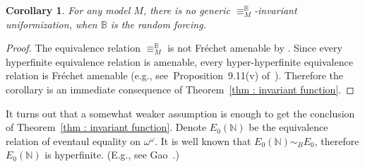\documentclass{amsart}
\newtheorem{corollary}[theorem]{Corollary}
\theoremstyle{definition}
\theoremstyle{remark}
\begin{document}
\begin{corollary}
\label{cor : Random}
    For any model \(M\), there is no generic \(\equiv^\mathbb{B}_M\)-invariant uniformization, when \(\mathbb{B}\) is the random forcing. 
\end{corollary}
\begin{proof}
The equivalence relation \(\equiv^\mathbb{B}_M\) is not Fr\'echet amenable by \cite[Theorem~4.4]{Smy22}.
Since every hyperfinite equivalence relation is amenable, every hyper-hyperfinite equivalence relation is Fr\'echet amenable (e.g., see~Proposition~9.11(v) of~\cite{Kec24}).
    Therefore the corollary is an immediate consequence of Theorem~\ref{thm : invariant function}.
    \end{proof}

It turns out that a somewhat weaker assumption is enough to get the conclusion of  Theorem~\ref{thm : invariant function}. Denote \(E_0(\mathbb{N})\) be the equivalence relation of eventaul equality on \(\omega^\omega\). It is well known that \(E_0(\mathbb{N})\sim_BE_0\), therefore \(E_0(\mathbb{N})\) is hyperfinite. (E.g., see Gao~\cite[Proposition~6.1.2]{Gao}.)
\end{document}
